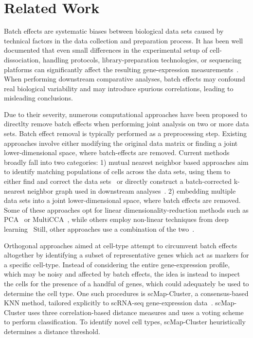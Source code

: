 \documentclass[runningheads]{llncs}
\begin{document}
\section{Related Work}

Batch effects are systematic biases between biological data sets caused by
technical factors in the data collection and preparation process. It has been
well documented that even small differences in the experimental setup of
cell-dissociation, handling protocols, library-preparation technologies, or
sequencing platforms can significantly affect the resulting gene-expression
measurements~\cite{Tung2017,Hicks2018}. When performing downstream comparative
analyses, batch effects may confound real biological variability and may
introduce spurious correlations, leading to misleading conclusions.

Due to their severity, numerous computational approaches have been proposed to
directlty remove batch effects when performing joint analysis on two or more data sets.
Batch effect removal is typically performed as a preprocessing step. Existing
approaches involve either modifying the original data matrix or finding a joint
lower-dimensional space, where batch-effects are removed. Current methods
broadly fall into two categories: 1) mutual nearest neighbor based approaches
aim to identify matching populations of cells across the data sets, using them
to either find and correct the data sets~\cite{Haghverdi2018} or directly
construct a batch-corrected k-nearest neighbor graph used in downstream
analyses~\cite{Park2018}. 2) embedding multiple data sets into a joint
lower-dimensional space, where batch effects are removed. Some of these
approaches opt for linear dimensionality-reduction methods such as
PCA~\cite{Korsunsky2019} or MultiCCA~\cite{Butler2018}, while others employ
non-linear techniques from deep learning~\cite{Li2020,Lopez2018} Still, other
approaches use a combination of the two~\cite{Stuart2019,Hie2019}.

Orthogonal approaches aimed at cell-type attempt to circumvent batch effects
altogether by identifying a subset of representative genes which act as markers
for a specific cell-type. Instead of considering the entire gene-expression
profile, which may be noisy and affected by batch effects, the idea is instead
to inspect the cells for the presence of a handful of genes, which could
adequately be used to determine the cell type. One such procedures is
scMap-Cluster, a consensus-based KNN method, tailored explicitly to scRNA-seq
gene-expression data~\cite{Kiselev2018}. scMap-Cluster uses three
correlation-based distance measures and uses a voting scheme to perform
classification. To identify novel cell types, scMap-Cluster heuristically
determines a distance threshold.
\end{document}
